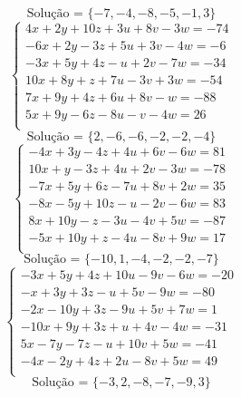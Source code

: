 \documentclass[12pt,oneside,a4paper]{article}
\begin{document}
\begin{equation*}
\text{Solução = }\{-7,-4,-8,-5,-1,3\}
\end{equation*}
\vspace{\baselineskip}
\begin{equation*}
\begin{cases}
4x+2y+10z+3u+8v-3w=-74 \\
-6x+2y-3z+5u+3v-4w=-6 \\
-3x+5y+4z-u+2v-7w=-34 \\
10x+8y+z+7u-3v+3w=-54 \\
7x+9y+4z+6u+8v-w=-88 \\
5x+9y-6z-8u-v-4w=26 \\
\end{cases}
\end{equation*}
\begin{equation*}
\text{Solução = }\{2,-6,-6,-2,-2,-4\}
\end{equation*}
\vspace{\baselineskip}
\begin{equation*}
\begin{cases}
-4x+3y-4z+4u+6v-6w=81 \\
10x+y-3z+4u+2v-3w=-78 \\
-7x+5y+6z-7u+8v+2w=35 \\
-8x-5y+10z-u-2v-6w=83 \\
8x+10y-z-3u-4v+5w=-87 \\
-5x+10y+z-4u-8v+9w=17 \\
\end{cases}
\end{equation*}
\begin{equation*}
\text{Solução = }\{-10,1,-4,-2,-2,-7\}
\end{equation*}
\vspace{\baselineskip}
\begin{equation*}
\begin{cases}
-3x+5y+4z+10u-9v-6w=-20 \\
-x+3y+3z-u+5v-9w=-80 \\
-2x-10y+3z-9u+5v+7w=1 \\
-10x+9y+3z+u+4v-4w=-31 \\
5x-7y-7z-u+10v+5w=-41 \\
-4x-2y+4z+2u-8v+5w=49 \\
\end{cases}
\end{equation*}
\begin{equation*}
\text{Solução = }\{-3,2,-8,-7,-9,3\}
\end{equation*}
\end{document}
